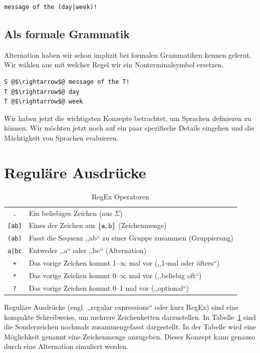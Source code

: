 \begin{lstlisting}
message of the (day|week)!
\end{lstlisting}

\subsection{Als formale Grammatik}
%
Alternation haben wir schon implizit bei formalen Grammatiken kennen gelernt. Wir wählen aus mit welcher Regel wir ein Nonterminalsymbol ersetzen.
%
\begin{lstlisting}
S @$\rightarrow$@ message of the T!
T @$\rightarrow$@ day
T @$\rightarrow$@ week
\end{lstlisting}

Wir haben jetzt die wichtigsten Konzepte betrachtet, um Sprachen definieren zu können. Wir möchten jetzt noch auf ein paar spezifische Details eingehen und die Mächtigkeit von Sprachen evaluieren.

\section{Reguläre Ausdrücke}
%
\begin{table}[ht]
 \begin{center}
  \begin{tabular}{cl}
   \hline
    \texttt{.}     & Ein beliebiges Zeichen (aus $\Sigma$) \\
    \texttt{[ab]}  & Eines der Zeichen aus $\left\{\texttt{a}, \texttt{b}\right\}$ (Zeichenmenge) \\
    \texttt{(ab)}  & Fasst die Sequenz ,,ab`` zu einer Gruppe zusammen (Gruppierung) \\
    \texttt{a|bc}  & Entweder ,,a`` oder ,,bc`` (Alternation) \\
    \texttt{+}     & Das vorige Zeichen kommt 1--$\infty$ mal vor (,,1-mal oder öfters``) \\
    \texttt{*}     & Das vorige Zeichen kommt 0--$\infty$ mal vor (,,beliebig oft``) \\
    \texttt{?}     & Das vorige Zeichen kommt 0--1 mal vor (,,optional``) \\
   \hline
  \end{tabular}
  \caption{RegEx Operatoren}
  \label{tab:regex_op}
 \end{center}
\end{table}
%
Reguläre Ausdrücke (engl. ,,regular expressions`` oder kurz RegEx) sind eine kompakte Schreibweise, um mehrere Zeichenketten darzustellen. In Tabelle~\ref{tab:regex_op} sind die Sonderzeichen nochmals zusammengefasst dargestellt. In der Tabelle wird eine Möglichkeit genannt eine Zeichenmenge anzugeben. Dieses Konzept kann genauso durch eine Alternation simuliert werden.

